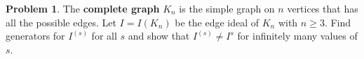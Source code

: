 \documentclass[11pt]{article}
\theoremstyle{definition}
\newtheorem{problem}{Problem}
\begin{document}
%


\begin{problem}
	The {\bf complete graph} $K_n$ is the simple graph on $n$ vertices that has all the possible edges. Let $I = I(K_n)$ be the edge ideal of $K_n$ with $n \geqslant 3$. Find generators for $I^{(s)}$ for all $s$ and show that $I^{(s)} \neq I^s$ for infinitely many values of $s$.
\end{problem}
\end{document}

